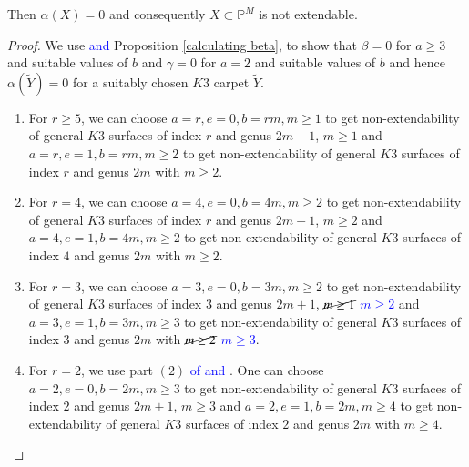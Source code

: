 \documentclass[11pt,twoside]{amsart}
\theoremstyle{plain}
\numberwithin{equation}{section}
\theoremstyle{definition}
\begin{document}
Then $\alpha(X) = 0$ and consequently $X \subset \mathbb{P}^M$ is not extendable.

\begin{proof}
    We use \textcolor{blue}{ and} Proposition \ref{calculating beta}, to show that $\beta = 0$ for $a \geq 3$ and suitable values of $b$ and $\gamma = 0$ for $a = 2$ and suitable values of $b$ and hence $\alpha(\widetilde{Y}) = 0$ for a suitably chosen $K3$ carpet $\widetilde{Y}$. 
    \begin{enumerate}
        \item[(1)] For $r \geq 5$, we can choose $a = r, e = 0, b = rm, m \geq 1$ to get non-extendability of general $K3$ surfaces of index $r$ and genus $2m+1$, $m \geq 1$ and $a = r, e = 1, b = rm, m \geq 2$ to get non-extendability of general $K3$ surfaces of index $r$ and genus $2m$ with $m \geq 2$. 

        \smallskip
        
        \item[(2)] For $r = 4$, we can choose $a = 4, e = 0, b = 4m, m \geq 2$ to get non-extendability of general $K3$ surfaces of index $r$ and genus $2m+1$, $m \geq 2$ and $a = 4, e = 1, b = 4m, m \geq 2$ to get non-extendability of general $K3$ surfaces of index $4$ and genus $2m$ with $m \geq 2$. 

       \smallskip
        
        \item[(3)] For $r = 3$, we can choose $a = 3, e = 0, b = 3m, m \geq 2$ to get non-extendability of general $K3$ surfaces of index $3$ and genus $2m+1$, $\cancel{m \geq 1}$ \textcolor{blue}{$m \geq 2$} and $a = 3, e = 1, b = 3m, m \geq 3$ to get non-extendability of general $K3$ surfaces of index $3$ and genus $2m$ with $\cancel{m \geq 2}$ \textcolor{blue}{$m \geq 3$}. 
        
        \smallskip

        \item[(4)] For $r = 2$, we use part $(2)$ \textcolor{blue}{of  and }. One can choose $a = 2, e = 0, b = 2m, m \geq 3$ to get non-extendability of general $K3$ surfaces of index $2$ and genus $2m+1$, $m \geq 3$ and $a = 2, e = 1, b = 2m, m \geq 4$ to get non-extendability of general $K3$ surfaces of index $2$ and genus $2m$ with $m \geq 4$.
       

\end{enumerate}
\end{proof}
\end{document}
